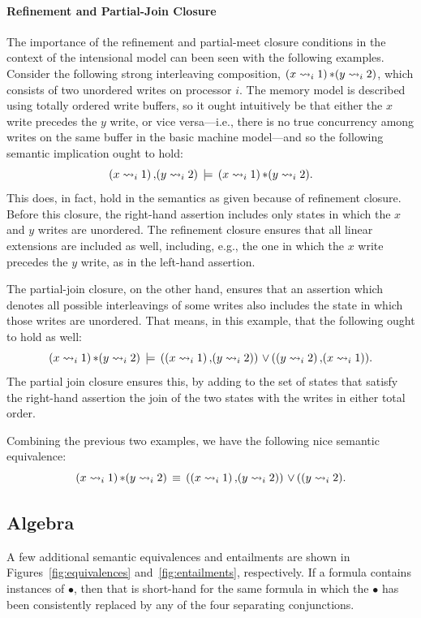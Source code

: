 \documentclass[11pt]{article}
\begin{document}
\paragraph{Refinement and Partial-Join Closure}

The importance of the refinement and partial-meet closure conditions in the context of the intensional model can been seen with the following examples. Consider the following strong interleaving composition, $(x \leadsto_{i} 1) \operatorname{\ast} (y \leadsto_{i} 2)$, which consists of two unordered writes on processor $i$. The memory model is described using totally ordered write buffers, so it ought intuitively be that either the $x$ write precedes the $y$ write, or vice versa---i.e., there is no true concurrency among writes on the same buffer in the basic machine model---and so the following semantic implication ought to hold: \[ (x \leadsto_{i} 1) \operatorname{,} (y \leadsto_{i} 2) \,\models\, (x \leadsto_{i} 1) \operatorname{\ast} (y \leadsto_{i} 2). \] This does, in fact, hold in the semantics as given because of refinement closure. Before this closure, the right-hand assertion includes only states in which the $x$ and $y$ writes are unordered. The refinement closure ensures that all linear extensions are included as well, including, e.g., the one in which the $x$ write precedes the $y$ write, as in the left-hand assertion. 

The partial-join closure, on the other hand, ensures that an assertion which denotes all possible interleavings of some writes also includes the state in which those writes are unordered. That means, in this example, that the following ought to hold as well: \[ (x \leadsto_{i} 1) \operatorname{\ast} (y \leadsto_{i} 2) \,\models\, ((x \leadsto_{i} 1) \operatorname{,} (y \leadsto_{i} 2)) \operatorname{\,\vee\,} ((y \leadsto_{i} 2) \operatorname{,} (x \leadsto_{i} 1)). \] The partial join closure ensures this, by adding to the set of states that satisfy the right-hand assertion the join of the two states with the writes in either total order. 

Combining the previous two examples, we have the following nice semantic equivalence: \[ (x \leadsto_{i} 1) \operatorname{\ast} (y \leadsto_{i} 2) \,\equiv\, ((x \leadsto_{i} 1) \operatorname{,} (y \leadsto_{i} 2)) \operatorname{\,\vee\,} ((y \leadsto_{i} 2). \]

\subsection{Algebra}
\label{sec:algebra}

A few additional semantic equivalences and entailments are shown in Figures~\ref{fig:equivalences} and~\ref{fig:entailments}, respectively. If a formula contains instances of $\bullet$, then that is short-hand for the same formula in which the $\bullet$ has been consistently replaced by any of the four separating conjunctions. 
\end{document}
